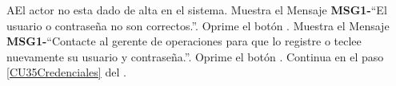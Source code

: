 		\begin{UCtrayectoriaA}{A}{El actor no esta dado de alta en el sistema.}
			\UCpaso Muestra el Mensaje {\bf MSG1-}``El usuario o contraseña no son correctos.''.
			\UCpaso[\UCactor] Oprime el botón .
			\UCpaso Muestra el Mensaje {\bf MSG1-}``Contacte al gerente de operaciones para que lo registre o teclee nuevamente su usuario y contraseña.''.
			\UCpaso[\UCactor] Oprime el botón .
			\UCpaso Continua en el paso \ref{CU35Credenciales} del .
		\end{UCtrayectoriaA}